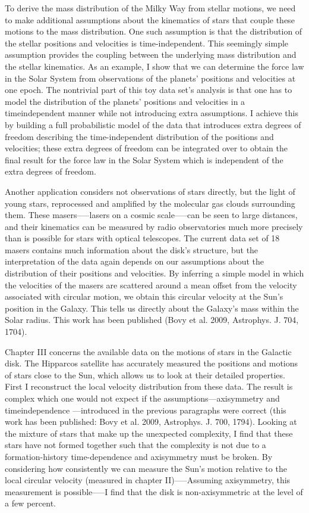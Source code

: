 To derive the mass distribution of the Milky Way from stellar motions,
we need to make additional assumptions about the kinematics of stars
that couple these motions to the mass distribution. One such
assumption is that the distribution of the stellar positions and
velocities is time-independent.  This seemingly simple assumption
provides the coupling between the underlying mass distribution and the
stellar kinematics. As an example, I show that we can determine the
force law in the Solar System from observations of the planets’
positions and velocities at one epoch. The nontrivial part of this toy
data set’s analysis is that one has to model the distribution of the
planets’ positions and velocities in a timeindependent manner while
not introducing extra assumptions. I achieve this by building a full
probabilistic model of the data that introduces extra degrees of
freedom describing the time-independent distribution of the positions
and velocities; these extra degrees of freedom can be integrated over
to obtain the final result for the force law in the Solar System which
is independent of the extra degrees of freedom.

Another application considers not observations of stars directly, but
the light of young stars, reprocessed and amplified by the molecular
gas clouds surrounding them. These masers—--lasers on a cosmic
scale—--can be seen to large distances, and their kinematics can be
measured by radio observatories much more precisely than is possible
for stars with optical telescopes. The current data set of 18 masers
contains much information about the disk’s structure, but the
interpretation of the data again depends on our assumptions about the
distribution of their positions and velocities. By inferring a simple
model in which the velocities of the masers are scattered around a
mean offset from the velocity associated with circular motion, we
obtain this circular velocity at the Sun’s position in the
Galaxy. This tells us directly about the Galaxy’s mass within the
Solar radius. This work has been published (Bovy et al. 2009,
Astrophys. J.  704, 1704). 

Chapter III concerns the available data on the motions of stars in the
Galactic disk. The Hipparcos satellite has accurately measured the
positions and motions of stars close to the Sun, which allows us to
look at their detailed properties. First I reconstruct the local
velocity distribution from these data. The result is complex which one
would not expect if the assumptions—axisymmetry and timeindependence
—introduced in the previous paragraphs were correct (this work has
been published: Bovy et al. 2009, Astrophys. J. 700, 1794). Looking at
the mixture of stars that make up the unexpected complexity, I find
that these stars have not formed together such that the complexity is
not due to a formation-history time-dependence and axisymmetry must be
broken. By considering how consistently we can measure the Sun’s
motion relative to the local circular velocity (measured in chapter
II)—--Assuming axisymmetry, this measurement is possible—--I find that
the disk is non-axisymmetric at the level of a few percent.
